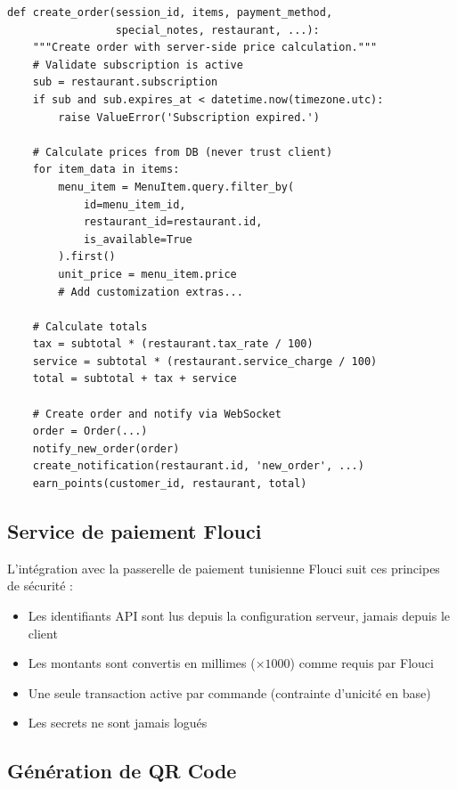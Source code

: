 \documentclass[12pt,a4paper]{report}
\begin{document}
\begin{codebox}
\begin{lstlisting}
def create_order(session_id, items, payment_method,
                 special_notes, restaurant, ...):
    """Create order with server-side price calculation."""
    # Validate subscription is active
    sub = restaurant.subscription
    if sub and sub.expires_at < datetime.now(timezone.utc):
        raise ValueError('Subscription expired.')

    # Calculate prices from DB (never trust client)
    for item_data in items:
        menu_item = MenuItem.query.filter_by(
            id=menu_item_id,
            restaurant_id=restaurant.id,
            is_available=True
        ).first()
        unit_price = menu_item.price
        # Add customization extras...

    # Calculate totals
    tax = subtotal * (restaurant.tax_rate / 100)
    service = subtotal * (restaurant.service_charge / 100)
    total = subtotal + tax + service

    # Create order and notify via WebSocket
    order = Order(...)
    notify_new_order(order)
    create_notification(restaurant.id, 'new_order', ...)
    earn_points(customer_id, restaurant, total)
\end{lstlisting}
\end{codebox}

\subsection{Service de paiement Flouci}

L'intégration avec la passerelle de paiement tunisienne Flouci suit ces principes de sécurité :
\begin{itemize}
    \item Les identifiants API sont lus depuis la configuration serveur, jamais depuis le client
    \item Les montants sont convertis en millimes ($\times 1000$) comme requis par Flouci
    \item Une seule transaction active par commande (contrainte d'unicité en base)
    \item Les secrets ne sont jamais logués
\end{itemize}

\subsection{Génération de QR Code}
\end{document}
